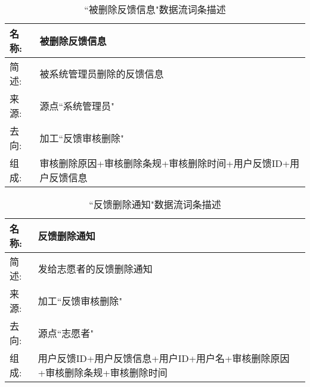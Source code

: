 \begin{table}[H]  
\caption{``被删除反馈信息"数据流词条描述}  
\begin{center}  
    \begin{tabular}{l p{11cm}} 
        \hline
        \quad 名称: & 被删除反馈信息 \\
        \hline
        \quad 简述: & 被系统管理员删除的反馈信息 \\
        \hline
        \quad 来源: & 源点``系统管理员" \\
        \hline
        \quad 去向: & 加工``反馈审核删除"\\
        \hline
        \quad 组成: & 审核删除原因+审核删除条规+审核删除时间+用户反馈ID+用户反馈信息  \\
        \hline
    \end{tabular}
    \label{tab1}
\end{center}
\end{table}

\begin{table}[H]  
\caption{``反馈删除通知"数据流词条描述}  
\begin{center}  
    \begin{tabular}{l p{11cm}} 
        \hline
        \quad 名称: & 反馈删除通知 \\
        \hline
        \quad 简述: & 发给志愿者的反馈删除通知 \\
        \hline
        \quad 来源: & 加工``反馈审核删除" \\
        \hline
        \quad 去向: & 源点``志愿者" \\
        \hline
        \quad 组成: & 用户反馈ID+用户反馈信息+用户ID+用户名+审核删除原因+审核删除条规+审核删除时间 \\
        \hline
    \end{tabular}
    \label{tab1}
\end{center}
\end{table}

